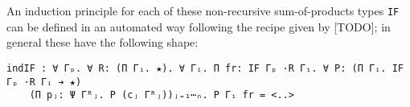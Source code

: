 \documentclass{article}
\begin{document}
An induction principle for each of these non-recursive sum-of-products types
\verb;IF; can be defined in an automated way following the recipe given by
[TODO]; in general these have the following shape:

\begin{verbatim}
indIF : ∀ Γₚ. ∀ R: (Π Γᵢ. ★). ∀ Γᵢ. Π fr: IF Γₚ ·R Γᵢ. ∀ P: (Π Γᵢ. IF Γₚ ·R Γᵢ ➔ ★)
    (Π pⱼ: Ψ Γᴿⱼ. P (cⱼ Γᴿⱼ))ⱼ₌₁⋯ₙ. P Γᵢ fr = <..>
\end{verbatim}



\end{document}
